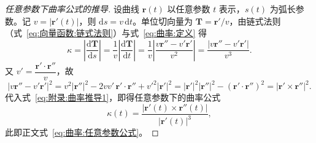 \begin{proof}[任意参数下曲率公式的推导]
	设曲线 $\boldsymbol{r}(t)$ 以任意参数 $t$ 表示，$s(t)$ 为弧长参数。记 $v=\left|\boldsymbol{r}'(t)\right|$，则 $\mathrm{d}s=v\,\mathrm{d}t$。单位切向量为 $\mathbf{T}=\boldsymbol{r}'/v$，由链式法则（式~\eqref{eq:向量函数:链式法则}）与式~\eqref{eq:曲率:定义} 得
	\begin{equation}
		\kappa=\left|\frac{\mathrm{d}\mathbf{T}}{\mathrm{d}s}\right|
		=\frac{1}{v}\left|\frac{\mathrm{d}\mathbf{T}}{\mathrm{d}t}\right|
		=\frac{1}{v}\left|\frac{v\boldsymbol{r}''-v'\boldsymbol{r}'}{v^{2}}\right|
		=\frac{\left|v\boldsymbol{r}''-v'\boldsymbol{r}'\right|}{v^{3}}.
		\label{eq:附录:曲率推导1}
	\end{equation}
	又 $v'=\dfrac{\boldsymbol{r}'\cdot\boldsymbol{r}''}{v}$，故
	\begin{equation}
		\left|v\boldsymbol{r}''-v'\boldsymbol{r}'\right|^{2}
		=v^{2}\left|\boldsymbol{r}''\right|^{2}-2vv'\,\boldsymbol{r}'\cdot\boldsymbol{r}''+v'^{2}\left|\boldsymbol{r}'\right|^{2}
		=\left|\boldsymbol{r}'\right|^{2}\left|\boldsymbol{r}''\right|^{2}-\left(\boldsymbol{r}'\cdot\boldsymbol{r}''\right)^{2}
		=\left|\boldsymbol{r}'\times\boldsymbol{r}''\right|^{2}.
		\label{eq:附录:曲率推导2}
	\end{equation}
	代入式~\eqref{eq:附录:曲率推导1}，即得任意参数下的曲率公式
	\begin{equation}
		\kappa(t)=\frac{\left|\boldsymbol{r}'(t)\times\boldsymbol{r}''(t)\right|}
		{\left|\boldsymbol{r}'(t)\right|^{3}},
		\label{eq:附录:曲率公式}
	\end{equation}
	此即正文式~\eqref{eq:曲率:任意参数公式}。
\end{proof}
